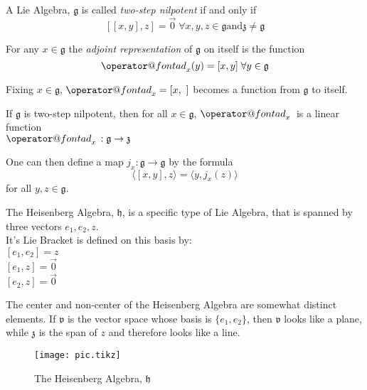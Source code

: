 \documentclass[11 pt]{article}
\makeatletter
\newcommand{\br}[2]{\left[#1,#2\right]}
\newcommand{\lag}[1]{\mathfrak{#1}}
\newcommand{\fg}{\mathfrak{g}}
\newcommand{\fz}{\mathfrak{z}}
\newcommand{\fv}{\mathfrak{v}}
\newcommand{\fh}{\mathfrak{h}}
\newcommand{\ad}[1]{\mathop{\operator@font ad}\nolimits_{#1}}
\makeatother
\begin{document}
\begin{definition}
    A Lie Algebra, $\fg$ is called \emph{two-step nilpotent} if and only if
    \[
        [[x,y],z] = \Vec{0} \; \forall x,y,z \in \fg
        \text{and} \fz \neq \fg
    \]
\end{definition}

\begin{definition}
    For any $x \in \fg$ the \emph{adjoint representation} of $\fg$ on itself is
    the function
    \[
        \ad{x}(y) = [x,y] \; \forall y \in \fg
    \]
\end{definition}

Fixing $x \in \lag{g}$, $\ad{x} = \br{x}{\ }$ becomes a function from $\lag{g}$
to itself.

If $\fg$ is two-step nilpotent, then for all $x \in \fg$, $\ad{x}{}$ is a
linear function
\\$\ad{x}{}: \fg \to \fz$

\begin{definition}
    One can then define a map $j_x :\lag{g} \to \lag{g}$ by the formula
    \[
    \langle\br{x}{y},z\rangle = \langle y,j_x(z)\rangle
    \]
    for all $y, z \in \lag{g}$.
\end{definition}

\begin{example}
    The Heisenberg Algebra, $\fh$,  is a specific type of Lie Algebra, that is
    spanned by three vectors $e_1, e_2, z$.
    \\It's Lie Bracket is defined on this basis by:
    \\$[e_1, e_2] = z$
    \\$[e_1, z] = \Vec{0}$
    \\$[e_2, z] = \Vec{0}$
\end{example}
The center and non-center of the Heisenberg Algebra are somewhat distinct
elements.
If $\fv$ is the vector space whose basis is $\{e_1, e_2\}$, then
$\fv$ looks like a plane, while $\fz$ is the span of $z$ and therefore looks
like a line.

\begin{figure}[h]
    \centering
    \texttt{[image: pic.tikz]} %
        \label{fig:pic} %
    \caption{\footnotesize The Heisenberg Algebra, $\fh$} %
\end{figure}

\pagebreak

\end{document}
